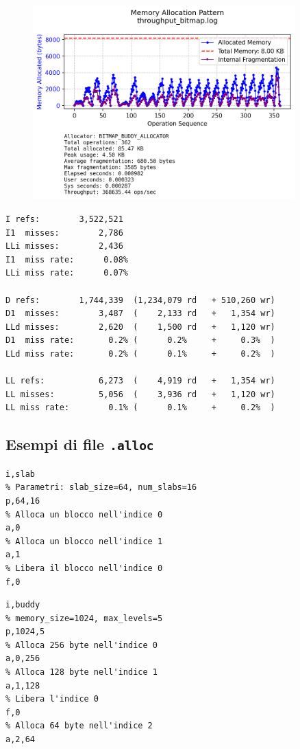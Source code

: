 \begin{figure}[H]
  \centering
  \includegraphics[width=0.9\textwidth]{graphs/throughput_bitmap.png}
  \label{fig:throughput_bitmap}
\end{figure}
\begin{lstlisting}[language={}]
I refs:        3,522,521
I1  misses:        2,786
LLi misses:        2,436
I1  miss rate:      0.08%
LLi miss rate:      0.07%

D refs:        1,744,339  (1,234,079 rd   + 510,260 wr)
D1  misses:        3,487  (    2,133 rd   +   1,354 wr)
LLd misses:        2,620  (    1,500 rd   +   1,120 wr)
D1  miss rate:       0.2% (      0.2%     +     0.3%  )
LLd miss rate:       0.2% (      0.1%     +     0.2%  )

LL refs:           6,273  (    4,919 rd   +   1,354 wr)
LL misses:         5,056  (    3,936 rd   +   1,120 wr)
LL miss rate:        0.1% (      0.1%     +     0.2%  )
\end{lstlisting}

\pagebreak

\subsection{Esempi di file \texttt{.alloc}}
\begin{lstlisting}[language={}]
% Tipo di allocatore (Slab)
i,slab         
% Parametri: slab_size=64, num_slabs=16
p,64,16        
% Alloca un blocco nell'indice 0
a,0            
% Alloca un blocco nell'indice 1
a,1            
% Libera il blocco nell'indice 0
f,0      
\end{lstlisting}      
\begin{lstlisting}[language={}]
% Benchmark per allocatore variabile
i,buddy
% memory_size=1024, max_levels=5
p,1024,5       
% Alloca 256 byte nell'indice 0
a,0,256        
% Alloca 128 byte nell'indice 1
a,1,128        
% Libera l'indice 0
f,0            
% Alloca 64 byte nell'indice 2
a,2,64         
\end{lstlisting}
\pagebreak




